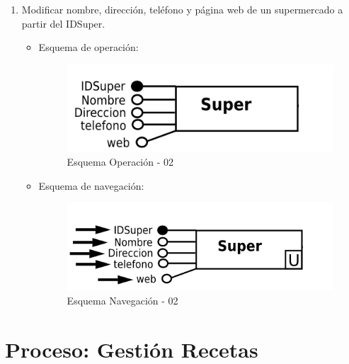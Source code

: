 \documentclass[a4paper,12pt]{report}
\begin{document}
\begin{enumerate}
\item Modificar nombre, dirección, teléfono y página web de un
supermercado a partir del IDSuper.
\begin{itemize}
\item Esquema de operación:
\begin{figure}[!htp]
\centering
\includegraphics[width=0.9\linewidth]{./operaciones/img/Super/02_ope.png}
\caption{Esquema Operación - 02}
\label{fig:ope02}
\medskip
\footnotesize
{}
\end{figure}
\item Esquema de navegación:
\begin{figure}[!htp]
\centering
\includegraphics[width=0.9\linewidth]{./operaciones/img/Super/02_nav.png}
\caption{Esquema Navegación - 02}
\label{fig:nave02}
\medskip
\footnotesize
{}
\end{figure}
\end{itemize}
\end{enumerate}
\section{Proceso: Gestión Recetas}
\label{sec-7-4}
\end{document}
